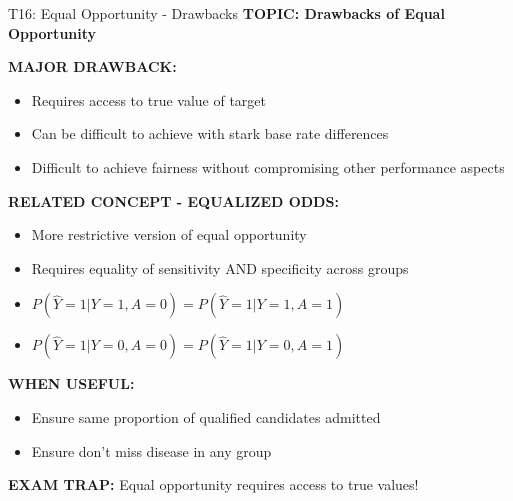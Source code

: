 \documentclass[8pt]{beamer}
\begin{document}
	\begin{frame}{T16: Equal Opportunity - Drawbacks}
		\fontsize{6.5}{7.5}\selectfont
		\textbf{TOPIC: Drawbacks of Equal Opportunity}
		
		\vspace{0.1cm}
		\textbf{MAJOR DRAWBACK:}
		\begin{itemize}
			\item Requires access to true value of target
			\item Can be difficult to achieve with stark base rate differences
			\item Difficult to achieve fairness without compromising other performance aspects
		\end{itemize}
		
		\vspace{0.1cm}
		\textbf{RELATED CONCEPT - EQUALIZED ODDS:}
		\begin{itemize}
			\item More restrictive version of equal opportunity
			\item Requires equality of sensitivity AND specificity across groups
			\item $P(\hat{Y}=1|Y=1,A=0) = P(\hat{Y}=1|Y=1,A=1)$
			\item $P(\hat{Y}=1|Y=0,A=0) = P(\hat{Y}=1|Y=0,A=1)$
		\end{itemize}
		
		\vspace{0.1cm}
		\textbf{WHEN USEFUL:}
		\begin{itemize}
			\item Ensure same proportion of qualified candidates admitted
			\item Ensure don't miss disease in any group
		\end{itemize}
		
		\textcolor{myred}{\textbf{EXAM TRAP:}} Equal opportunity requires \textcolor{myblue}{access to true values}!
	\end{frame}
	
\end{document}
